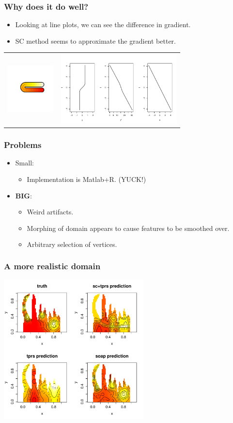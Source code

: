 \documentclass[ignorenonframetext]{beamer} %
\newcommand{\bc}{\begin{center}}
\newcommand{\ec}{\end{center}}
\newcommand{\bi}{\begin{itemize}}
\newcommand{\ei}{\end{itemize}}
\begin{document}
\begin{frame}
	\frametitle{Why does it do well?}
       \bi
         \item Looking at line plots, we can see the difference in gradient.
         \item SC method seems to approximate the gradient better.
       \ei
       \bc\begin{tabular}{c c}
            \centering
          \includegraphics[width=1in, trim=1in 0.75in 0.5in 0.5in]{figs/horseshoecentreline-1} & \includegraphics[width=2.5in]{figs/centrelinelineplots}\\
       \end{tabular}\ec
\end{frame}


\begin{frame}
	\frametitle{Problems}
       \bi
         \item Small:
         \bi
         \item Implementation is Matlab+R. (YUCK!)
         \ei
         \item \textbf{BIG}:
         \bi
         \item Weird artifacts.
         \item Morphing of domain appears to cause features to be smoothed over.
         \item Arbitrary selection of vertices.
         \ei
        \ei
\end{frame}

\begin{frame}
	\frametitle{A more realistic domain}
            \centering
              \includegraphics[width=3in]{figs/wigglytop2-real}\\
\end{frame}
\end{document}
